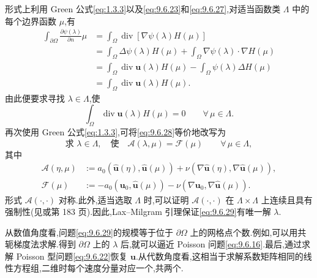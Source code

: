 形式上利用 Green 公式\eqref{eq:1.3.3}以及\eqref{eq:9.6.23}和\eqref{eq:9.6.27},对适当函数类 \(\Lambda\) 中的每个边界函数 \(\mu\),有
\[
  \begin{aligned}
    \int_{\partial\Omega}\frac{\partial\psi(\lambda)}{\partial n}\mu
      &=\int_\Omega\operatorname{div}[\nabla\psi(\lambda)H(\mu)]\\
      &=\int_\Omega\Delta\psi(\lambda)H(\mu)
           +\int_\Omega\nabla\psi(\lambda)\cdot\nabla H(\mu)\\
      &=\int_\Omega\operatorname{div}\boldsymbol{u}(\lambda)H(\mu)
           -\int_\Omega\psi(\lambda)\Delta H(\mu)\\
      &=\int_\Omega\operatorname{div}\boldsymbol{u}(\lambda)H(\mu).
  \end{aligned}
\]
由此便要求寻找 \(\lambda\in\Lambda\),使
\begin{equation}\label{eq:9.6.28}
  \int_\Omega\operatorname{div}\boldsymbol{u}(\lambda)H(\mu)=0\qquad\forall\,\mu\in\Lambda.
\end{equation}
再次使用 Green 公式\eqref{eq:1.3.3},可将\eqref{eq:9.6.28}等价地改写为
\begin{equation}\label{eq:9.6.29}
  \text{求 }\lambda\in\Lambda,\quad\text{使}\quad
   \mathcal A(\lambda,\mu)=\mathcal F(\mu)\qquad\forall\,\mu\in\Lambda,
\end{equation}
其中
\[
  \begin{aligned}
    \mathcal A(\eta,\mu)
      &:=a_0(\widehat{\boldsymbol{u}}(\eta),\widehat{\boldsymbol{u}}(\mu))
       +\nu(\nabla\widehat{\boldsymbol{u}}(\eta),\nabla\widehat{\boldsymbol{u}}(\mu)),\\
    \mathcal F(\mu)
      &:=-a_0(\boldsymbol{u}_0,\widehat{\boldsymbol{u}}(\mu))
       -\nu(\nabla\boldsymbol{u}_0,\nabla\widehat{\boldsymbol{u}}(\mu)).
  \end{aligned}
\]
形式 \(\mathcal A(\cdot,\cdot)\) 对称.此外,适当选取 \(\Lambda\) 时,可以证明 \(\mathcal A(\cdot,\cdot)\) 在 \(\Lambda\times\Lambda\) 上连续且具有强制性(见或第 183 页).因此,Lax--Milgram 引理保证\eqref{eq:9.6.29}有唯一解 \(\lambda\).

从数值角度看,问题\eqref{eq:9.6.29}的规模等于位于 \(\partial\Omega\) 上的网格点个数.例如,可以用共轭梯度法求解.得到 \(\partial\Omega\) 上的 \(\lambda\) 后,就可以逼近 Poisson 问题\eqref{eq:9.6.16}.最后,通过求解 Poisson 型问题\eqref{eq:9.6.22}恢复 \(\boldsymbol{u}\).从代数角度看,这相当于求解系数矩阵相同的线性方程组,二维时每个速度分量对应一个,共两个.

